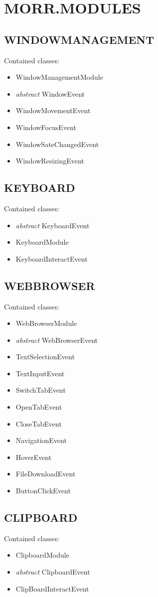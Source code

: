 \section{MORR.MODULES}
\subsection*{WINDOWMANAGEMENT}
Contained classes:
\begin{itemize}
\item WindowManagementModule
\item \textit{abstract} WindowEvent
\item WindowMovementEvent
\item WindowFocusEvent
\item WindowSateChangedEvent
\item WindowResizingEvent
\end{itemize}
\subsection*{KEYBOARD}
Contained classes:
\begin{itemize}
\item \textit{abstract} KeyboardEvent
\item KeyboardModule
\item KeyboardInteractEvent
\end{itemize}
\subsection*{WEBBROWSER}
Contained classes:
\begin{itemize}
\item WebBrowserModule
\item \textit{abstract} WebBrowserEvent
\item TextSelectionEvent
\item TextInputEvent
\item SwitchTabEvent
\item OpenTabEvent
\item CloseTabEvent
\item NavigationEvent
\item HoverEvent
\item FileDownloadEvent
\item ButtonClickEvent
\end{itemize}
\subsection*{CLIPBOARD}
Contained classes:
\begin{itemize}
\item ClipboardModule
\item \textit{abstract} ClipboardEvent
\item ClipBoardInteractEvent
\end{itemize}

